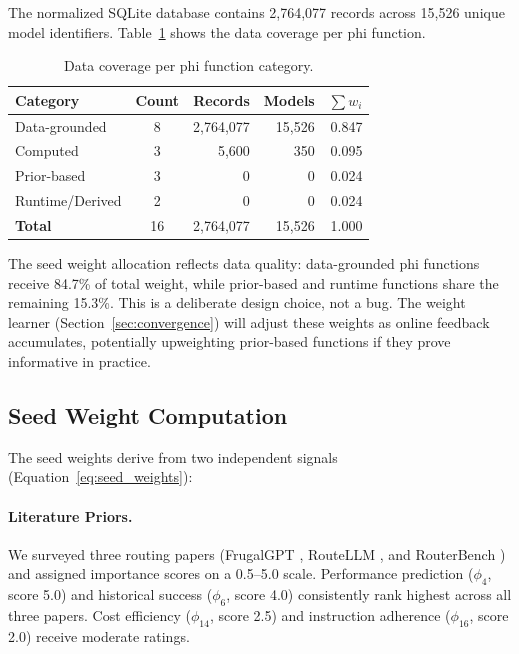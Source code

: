 The normalized SQLite database contains 2,764,077 records across 15,526 unique model identifiers. Table~\ref{tab:phi_coverage} shows the data coverage per phi function.

\begin{table}[h]
\centering
\caption{Data coverage per phi function category.}
\label{tab:phi_coverage}
\small
\begin{tabular}{lcrrr}
\toprule
\textbf{Category} & \textbf{Count} & \textbf{Records} & \textbf{Models} & \textbf{$\sum w_i$} \\
\midrule
Data-grounded & 8 & 2,764,077 & 15,526 & 0.847 \\
Computed & 3 & 5,600 & 350 & 0.095 \\
Prior-based & 3 & 0 & 0 & 0.024 \\
Runtime/Derived & 2 & 0 & 0 & 0.024 \\
\midrule
\textbf{Total} & 16 & 2,764,077 & 15,526 & 1.000 \\
\bottomrule
\end{tabular}
\end{table}

The seed weight allocation reflects data quality: data-grounded phi functions receive 84.7\% of total weight, while prior-based and runtime functions share the remaining 15.3\%. This is a deliberate design choice, not a bug. The weight learner (Section~\ref{sec:convergence}) will adjust these weights as online feedback accumulates, potentially upweighting prior-based functions if they prove informative in practice.

\subsection{Seed Weight Computation}

The seed weights derive from two independent signals (Equation~\ref{eq:seed_weights}):

\paragraph{Literature Priors.} We surveyed three routing papers (FrugalGPT \citep{chen2023frugalgpt}, RouteLLM \citep{ong2024routellm}, and RouterBench \citep{hu2024routerbench}) and assigned importance scores on a 0.5--5.0 scale. Performance prediction ($\phi_4$, score 5.0) and historical success ($\phi_6$, score 4.0) consistently rank highest across all three papers. Cost efficiency ($\phi_{14}$, score 2.5) and instruction adherence ($\phi_{16}$, score 2.0) receive moderate ratings.

